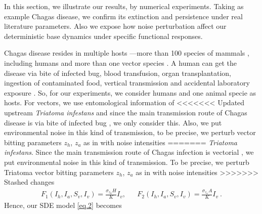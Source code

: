 	In this section, we illustrate our results, by numerical experiments. Taking 
as example Chagas disease, we confirm its extinction and persistence under 
real literature parameters. Also we expose how noise perturbation affect our 
deterministic base dynamics under specific functional responses. 

	Chagas disease resides in multiple hosts ---more than \num{100} 
species of mammals \cite{Crawford2014}, including humans and more than one 
vector species \cite{Steverding2014}.  A human can get the disease via bite of 
infected bug, blood transfusion, organ transplantation, ingestion of
contaminated food, vertical transmission and accidental laboratory exposure 
\citep{Nunes2013}. So, for our experiments, we consider humans and one animal 
specie as hosts. For vectors, we use entomological information of 
<<<<<<< Updated upstream
\textit{Triatoma infestans} and since the main 
transmission route of Chagas disease is via bite of infected bug 
\citep{Nouvellet2015}, we only consider this. Also, we put environmental noise 
in this kind of transmission, to be precise, we perturb vector bitting 
parameters 
$z_h$, $z_a$ as in  with  noise intensities
=======
\textit{Triatoma infestans}. 
Since the main transmission route of Chagas infection is vectorial 
\citep{Nouvellet2015}, we put environmental noise in this kind of transmission.
To be precise, we perturb Triatoma vector bitting parameters $z_h$, $z_a$ as 
in  with  noise intensities
>>>>>>> Stashed changes
\begin{align}
	F_{1}(I_{h},I_{a},S_{v},I_{v}) 
		= 
		\frac{
			\sigma_{z_h}	H
				}
				{
					K
				}
				I_{v} ,
				&&
	F_{2}(I_{h},I_{a},S_{v},I_{v}) 
		= \frac{
				\sigma_{z_a} A 
			}
			{
				K
			} I_{v} ~.
\end{align}
Hence, our SDE model \eqref{eq.2} becomes
